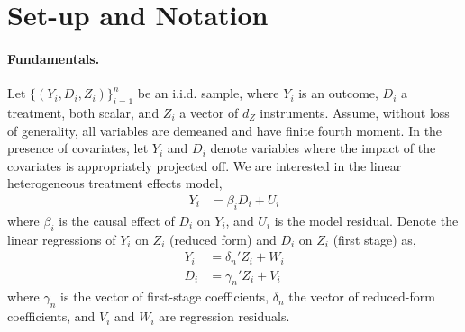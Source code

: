 \section{Set-up and Notation}

\label{sec:set-up-not}

\paragraph*{Fundamentals.}
Let \(\{(Y_i,D_i,Z_i)\}_{i=1}^n\) be an i.i.d. sample, where \(Y_i\) is an outcome, \(D_i\) a treatment, both scalar, and \(Z_i\) a vector of \(d_Z\) instruments. 
Assume, without loss of generality,  all variables are demeaned and have finite fourth moment.
In the presence of covariates, let \(Y_i\) and \(D_i\) denote variables where the impact of the covariates is appropriately projected off. 
We are interested in the linear  heterogeneous treatment effects model,
\begin{align}
       Y_i &= \beta_i D_i + U_i\label{eq:model-equation}
\end{align}
where \(\beta_i\) is the causal effect of \(D_i\) on \(Y_i\), and \(U_i\) is the model residual.
Denote the linear regressions of  \(Y_i\) on \(Z_i\)  (reduced form) and \(D_i\) on \(Z_i\)  (first stage) as,
\begin{align}
Y_i &=  \delta_n' Z_i + W_i \label{eq:reduced-form-equation}\\ 
D_i &= \gamma_n' Z_i + V_i \label{eq:first-stage-equation}  
\end{align}
where \(\gamma_n\) is the vector of first-stage coefficients,
\(\delta_n\) the vector of reduced-form coefficients, and \(V_i\) and \(W_i\)
are regression residuals. 

